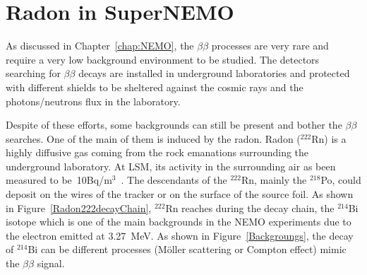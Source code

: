 \documentclass[main.tex]{subfiles}
\begin{document}
\chapter{Radon in SuperNEMO}\label{chap:Radon}







\NI As discussed in Chapter~\ref{chap:NEMO}, the $\beta\beta$ processes are very rare and require a very low background environment to be studied. The detectors searching for $\beta\beta$ decays are installed in underground laboratories and protected with different shields to be sheltered against the cosmic rays and the photons/neutrons flux in the laboratory.


\bigskip


\NI Despite of these efforts, some backgrounds can still be present and bother the $\beta\beta$ searches. One of the main of them is induced by the radon. Radon ($^{\text{222}}$Rn) is a highly diffusive gas coming from the rock emanations surrounding the underground laboratory. At LSM, its activity in the surrounding air as been measured to be~10Bq/m$^3$~\cite{RadonLSM}. The descendants of the $^{\text{222}}$Rn, mainly the $^{\text{218}}$Po, could deposit on the wires of the tracker or on the surface of the source foil. As shown in Figure~\ref{Radon222decayChain}, $^{\text{222}}$Rn reaches during the decay chain, the $^{\text{214}}$Bi isotope which is one of the main backgrounds in the NEMO experiments due to the electron emitted at 3.27~MeV. As shown in Figure~\ref{Backgroungs}, the decay of $^{\text{214}}$Bi can be different processes (Möller scattering or Compton effect) mimic the $\beta\beta$ signal. 
\end{document}
